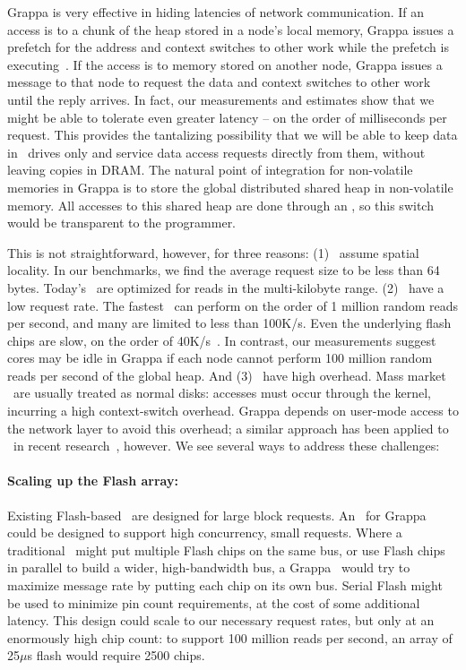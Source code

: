 Grappa is very effective in hiding latencies of network communication.  If an access is to a chunk of the heap stored in a node's local memory, Grappa issues a prefetch for the address and context switches to other work while the prefetch is executing~\cite{Nelson:hotpar2011}. If the access is to memory stored on another node, Grappa issues a message to that node to request the data and context switches to other work until the reply arrives.  In fact, our measurements and estimates show that we might be able to tolerate even greater latency -- on the order of milliseconds per request.  This provides the tantalizing possibility that we will be able to keep data in \ssd\ drives only and service data access requests directly from them, without leaving copies in DRAM.  The natural point of integration for non-volatile memories in Grappa is to store the global distributed shared heap in non-volatile memory. All accesses to this shared heap are done through an \api, so this switch would be transparent to the programmer.

This is not straightforward, however, for three reasons: (1) \ssds\ assume spatial locality. In our benchmarks, we find the average request size to be less than 64 bytes. Today's \ssds\ are optimized for reads in the multi-kilobyte range. (2) \ssds\ have a low request rate. The fastest~\cite{fusionio} can perform on the order of 1 million random reads per second, and many are limited to less than 100K/s. Even the underlying flash chips are slow, on the order of 40K/s~\cite{micronFlash}. In contrast, our measurements suggest cores may be idle in Grappa if each node cannot perform 100 million random reads per second of the global heap. And (3) \ssds\ have high overhead. Mass market \ssds\ are usually treated as normal disks: accesses must occur through the kernel, incurring a high context-switch overhead. Grappa depends on user-mode access to the network layer to avoid this overhead; a similar approach has been applied to \ssds\ in recent research~\cite{caulfield:2012}, however.  We see several ways to address these challenges:

\paragraph{Scaling up the Flash array:} Existing Flash-based \ssds\ are designed for large block requests. An \ssd\ for Grappa could be designed to support high concurrency, small requests. Where a traditional \ssd\ might put multiple Flash chips on the same bus, or use Flash chips in parallel to build a wider, high-bandwidth bus, a Grappa \ssd\ would try to maximize message rate by putting each chip on its own bus. Serial Flash might be used to minimize pin count requirements, at the cost of some additional latency. This design could scale to our necessary request rates, but only at an enormously high chip count: to support 100 million reads per second, an array of 25$\mu$s flash would require 2500 chips.

